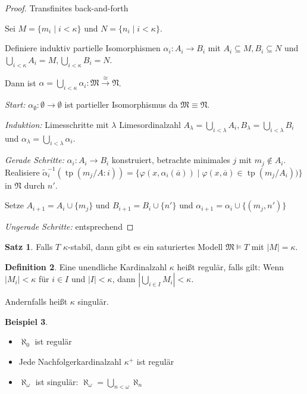 \documentclass[12pt,parskip=full]{scrartcl}
\newcommand{\abs}[1]{{\left| #1 \right|}}
\theoremstyle{definition}
\newtheorem{theorem}{Satz}[section]
\newtheorem{definition}[theorem]{Definition}
\newtheorem{example}[theorem]{Beispiel}
\begin{document}
 	\begin{proof}
 		Transfinites back-and-forth
 		
 		Sei $M = \{ m_i \mid i < \kappa \}$ und $N = \{ n_i \mid i < \kappa \}$.
 		
 		Definiere induktiv partielle Isomorphismen $\alpha_i: A_i \to B_i$ mit $A_i \subseteq M, B_i \subseteq N$ und $\bigcup_{i < \kappa} A_i = M, \bigcup_{i < \kappa} B_i = N$.
 		
 		Dann ist $\alpha = \bigcup_{i < \kappa} \alpha_i: \mathfrak{M} \overset{\cong}{\to} \mathfrak{N}$.
 		
 		\textit{Start:} $\alpha_\emptyset: \emptyset \to \emptyset$ ist partieller Isomorphismus da $\mathfrak{M} \equiv \mathfrak{N}$.
 		
 		\textit{Induktion:} Limesschritte mit $\lambda$ Limesordinalzahl $A_\lambda = \bigcup_{i < \lambda} A_i, B_\lambda = \bigcup_{i < \lambda} B_i$ und $\alpha_\lambda = \bigcup_{i < \lambda} \alpha_i$.
 		
 		\textit{Gerade Schritte:} $\alpha_i: A_i \to B_i$ konstruiert, betrachte minimales $j$ mit $m_j \notin A_i$. Realisiere $\tilde{\alpha}_i^{-1}\left( \operatorname{tp}(m_j / A:i) \right) = \{ \varphi(x, \alpha_i(\overline{a})) \mid \varphi(x, \overline{a}) \in \operatorname{tp}(m_j/A_i)) \}$ in $\mathfrak{N}$ durch $n'$.
 		
 		Setze $A_{i+1} = A_i \cup \{ m_j \}$ und $B_{i+1} = B_i \cup \{ n' \}$ und $\alpha_{i+1} = \alpha_i \cup \{ (m_j, n') \}$
 		
 		\textit{Ungerade Schritte:} entsprechend
 	\end{proof}
 
 	\begin{theorem}
 		Falls $T$ $\kappa$-stabil, dann gibt es ein saturiertes Modell $\mathfrak{M} \models T$ mit $\abs{M} = \kappa$.
 	\end{theorem}
 
 	\begin{definition}
 		Eine unendliche Kardinalzahl $\kappa$ heißt regulär, falls gilt:
 		Wenn $\abs{M_i} < \kappa$ für $i \in I$ und $\abs{I} < \kappa$, dann $\abs{\bigcup_{i \in I} M_i} < \kappa$.
 		
 		Andernfalls heißt $\kappa$ singulär.
 	\end{definition}
 
 	\begin{example}
 		\begin{itemize}
 			\item $\aleph_0$ ist regulär
 			\item Jede Nachfolgerkardinalzahl $\kappa^+$ ist regulär
 			\item $\aleph_\omega$ ist singulär: $\aleph_\omega = \bigcup_{n < \omega} \aleph_n$
 		\end{itemize}
 	\end{example}
 
\end{document}
